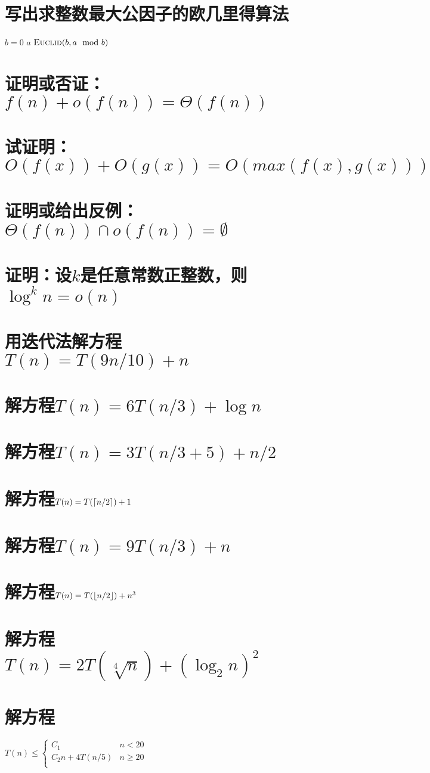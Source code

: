 \documentclass{article}
\DeclarePairedDelimiter{\ceil}{\lceil}{\rceil}
\DeclarePairedDelimiter{\floor}{\lfloor}{\rfloor}
\begin{document}
\section{写出求整数最大公因子的欧几里得算法}
\begin{codebox}
  \li \If $b = 0$
  \li  \Then  \Return $a$
  \li \ElseNoIf \Return $\textnormal{\scshape Euclid}(b, a\mod b)$
      \End
\end{codebox}

\section{证明或否证：$f(n)+o(f(n))=\Theta(f(n))$}

\section{试证明：$O(f(x))+O(g(x))=O(max(f(x), g(x)))$}

\section{证明或给出反例：$\Theta(f(n)) \cap o(f(n)) = \emptyset $}

\section{证明：设$k$是任意常数正整数，则$\log^kn=o(n)$}

\section{用迭代法解方程$T(n)=T(9n/10)+n$}

\section{解方程$T(n)=6T(n/3)+\log n$}

\section{解方程$T(n)=3T(n/3+5)+n/2$}

\section{解方程$T(n)=T(\ceil {n/2})+1$}

\section{解方程$T(n)=9T(n/3)+n$}

\section{解方程$T(n)=T(\floor {n/2})+n^3$}

\section{解方程$T(n)=2T(\sqrt[4]n)+(\log_2n)^2$}


\section{解方程}
\large {
  $
  T(n) \leq \begin{cases}
    C_1 & n < 20\\
    C_2n+4T(n/5) & n \geq 20\\
  \end{cases}
  $
}
\end{document}
